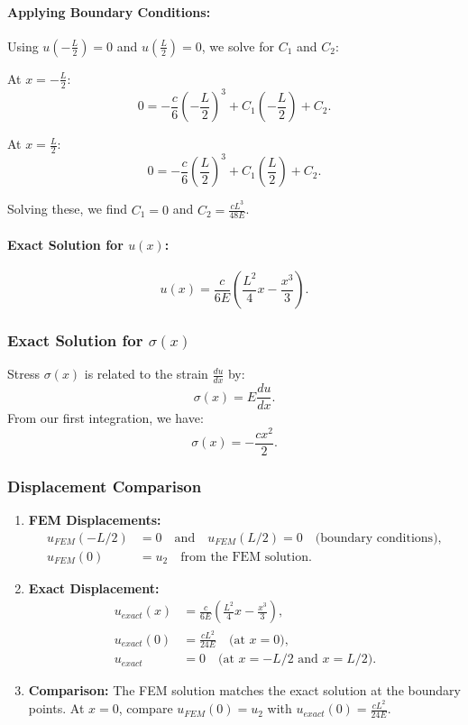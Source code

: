 \paragraph{Applying Boundary Conditions:} Using \( u\left(-\frac{L}{2}\right) = 0 \) and \( u\left(\frac{L}{2}\right) = 0 \), we solve for \( C_1 \) and \( C_2 \):

At \( x = -\frac{L}{2} \):
\[
0 = -\frac{c}{6}\left(-\frac{L}{2}\right)^3 + C_1\left(-\frac{L}{2}\right) + C_2.
\]

At \( x = \frac{L}{2} \):
\[
0 = -\frac{c}{6}\left(\frac{L}{2}\right)^3 + C_1\left(\frac{L}{2}\right) + C_2.
\]

Solving these, we find \( C_1 = 0 \) and \( C_2 = \frac{c L^3}{48 E} \).

\paragraph{Exact Solution for \( u(x) \):}
\[
u(x) = \frac{c}{6 E} \left(\frac{L^2}{4} x - \frac{x^3}{3}\right).
\]

\subsubsection*{Exact Solution for \( \sigma(x) \)}

Stress \( \sigma(x) \) is related to the strain \( \frac{du}{dx} \) by:
\[
\sigma(x) = E \frac{du}{dx}.
\]
From our first integration, we have:
\[
\sigma(x) = -\frac{c x^2}{2}.
\]

\subsubsection*{Displacement Comparison}

\begin{enumerate}
    \item \textbf{FEM Displacements:} 
        \begin{align*}
            u_{FEM}(-L/2) &= 0 \quad \text{and} \quad u_{FEM}(L/2) = 0 \quad \text{(boundary conditions)}, \\
            u_{FEM}(0) &= u_2 \quad \text{from the FEM solution}.
        \end{align*}

    \item \textbf{Exact Displacement:}
        \begin{align*}
            u_{exact}(x) &= \frac{c}{6E} \left(\frac{L^2}{4} x - \frac{x^3}{3}\right), \\
            u_{exact}(0) &= \frac{c L^2}{24E} \quad \text{(at } x = 0\text{)}, \\
            u_{exact} &= 0 \quad \text{(at } x = -L/2 \text{ and } x = L/2\text{)}.
        \end{align*}

    \item \textbf{Comparison:} The FEM solution matches the exact solution at the boundary points. At \( x = 0 \), compare \( u_{FEM}(0) = u_2 \) with \( u_{exact}(0) = \frac{c L^2}{24E} \).
\end{enumerate}

